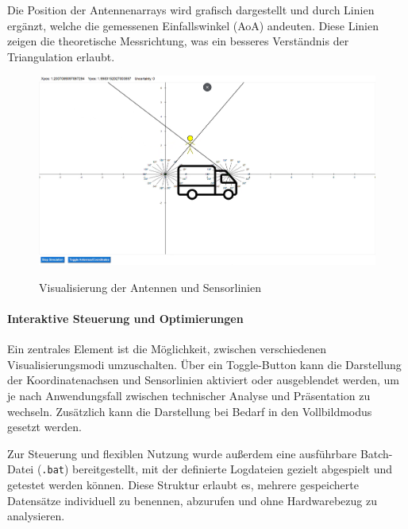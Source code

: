 \documentclass[a4paper, 12pt]{article} %
\begin{document}
Die Position der Antennenarrays wird grafisch dargestellt und durch Linien ergänzt, welche die gemessenen Einfallswinkel (\ac{AoA}) andeuten. Diese Linien 
zeigen die theoretische Messrichtung, was ein besseres Verständnis der Triangulation erlaubt.

\begin{figure}[H]
    \includegraphics[width=1\linewidth]{images/Visualisierung Antennen.png}\\[1ex]
    \centering
    \caption{Visualisierung der Antennen und Sensorlinien \cite{tadic-studienarbeit-ui}}
    \label{ABBILDUNG}
\end{figure}

\paragraph{Interaktive Steuerung und Optimierungen}

Ein zentrales Element ist die Möglichkeit, zwischen verschiedenen Visualisierungsmodi umzuschalten. Über ein Toggle-Button kann die Darstellung der 
Koordinatenachsen und Sensorlinien aktiviert oder ausgeblendet werden, um je nach Anwendungsfall zwischen technischer Analyse und Präsentation zu 
wechseln. Zusätzlich kann die Darstellung bei Bedarf in den Vollbildmodus gesetzt werden.

Zur Steuerung und flexiblen Nutzung wurde außerdem eine ausführbare Batch-Datei (\texttt{.bat}) bereitgestellt, mit der definierte Logdateien gezielt 
abgespielt und getestet werden können. Diese Struktur erlaubt es, mehrere gespeicherte Datensätze individuell zu benennen, abzurufen und ohne 
Hardwarebezug zu analysieren.
\end{document}
